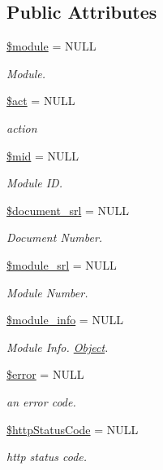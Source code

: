 \subsection*{Public Attributes}
\begin{DoxyCompactItemize}
\item 
\hyperlink{classModuleHandler_a24f28ac6c101582f043bef672a9f3b00}{\$module} = N\+U\+L\+L
\begin{DoxyCompactList}\small\item\em Module. \end{DoxyCompactList}\item 
\hyperlink{classModuleHandler_ae332c92a6ad1e9e823281d708088a0ff}{\$act} = N\+U\+L\+L
\begin{DoxyCompactList}\small\item\em action \end{DoxyCompactList}\item 
\hyperlink{classModuleHandler_a6bb7e9e29c0fb9893d051179281b093e}{\$mid} = N\+U\+L\+L
\begin{DoxyCompactList}\small\item\em Module I\+D. \end{DoxyCompactList}\item 
\hyperlink{classModuleHandler_acf9f6062042025aab6a7e10f6b261909}{\$document\+\_\+srl} = N\+U\+L\+L
\begin{DoxyCompactList}\small\item\em Document Number. \end{DoxyCompactList}\item 
\hyperlink{classModuleHandler_ad79751537e64d7bfc7dc6fa4280043b0}{\$module\+\_\+srl} = N\+U\+L\+L
\begin{DoxyCompactList}\small\item\em Module Number. \end{DoxyCompactList}\item 
\hyperlink{classModuleHandler_a2388e5ef665a5a82efa00c8c894df33c}{\$module\+\_\+info} = N\+U\+L\+L
\begin{DoxyCompactList}\small\item\em Module Info. \hyperlink{classObject}{Object}. \end{DoxyCompactList}\item 
\hyperlink{classModuleHandler_ad81b78f21e42724e73da6808c561159c}{\$error} = N\+U\+L\+L
\begin{DoxyCompactList}\small\item\em an error code. \end{DoxyCompactList}\item 
\hyperlink{classModuleHandler_a033e864206ca6a6494af015baa5d2365}{\$http\+Status\+Code} = N\+U\+L\+L
\begin{DoxyCompactList}\small\item\em http status code. \end{DoxyCompactList}\end{DoxyCompactItemize}



